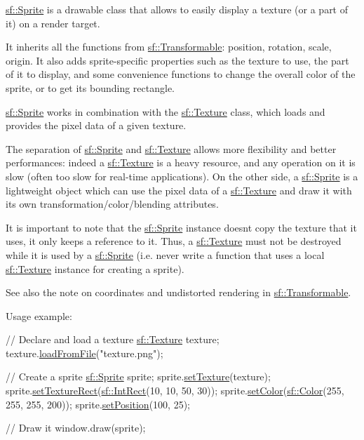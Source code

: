 \hyperlink{classsf_1_1Sprite}{sf\+::\+Sprite} is a drawable class that allows to easily display a texture (or a part of it) on a render target.

It inherits all the functions from \hyperlink{classsf_1_1Transformable}{sf\+::\+Transformable}\+: position, rotation, scale, origin. It also adds sprite-\/specific properties such as the texture to use, the part of it to display, and some convenience functions to change the overall color of the sprite, or to get its bounding rectangle.

\hyperlink{classsf_1_1Sprite}{sf\+::\+Sprite} works in combination with the \hyperlink{classsf_1_1Texture}{sf\+::\+Texture} class, which loads and provides the pixel data of a given texture.

The separation of \hyperlink{classsf_1_1Sprite}{sf\+::\+Sprite} and \hyperlink{classsf_1_1Texture}{sf\+::\+Texture} allows more flexibility and better performances\+: indeed a \hyperlink{classsf_1_1Texture}{sf\+::\+Texture} is a heavy resource, and any operation on it is slow (often too slow for real-\/time applications). On the other side, a \hyperlink{classsf_1_1Sprite}{sf\+::\+Sprite} is a lightweight object which can use the pixel data of a \hyperlink{classsf_1_1Texture}{sf\+::\+Texture} and draw it with its own transformation/color/blending attributes.

It is important to note that the \hyperlink{classsf_1_1Sprite}{sf\+::\+Sprite} instance doesn\textquotesingle{}t copy the texture that it uses, it only keeps a reference to it. Thus, a \hyperlink{classsf_1_1Texture}{sf\+::\+Texture} must not be destroyed while it is used by a \hyperlink{classsf_1_1Sprite}{sf\+::\+Sprite} (i.\+e. never write a function that uses a local \hyperlink{classsf_1_1Texture}{sf\+::\+Texture} instance for creating a sprite).

See also the note on coordinates and undistorted rendering in \hyperlink{classsf_1_1Transformable}{sf\+::\+Transformable}.

Usage example\+: 
\begin{DoxyCode}
\textcolor{comment}{// Declare and load a texture}
\hyperlink{classsf_1_1Texture}{sf::Texture} texture;
texture.\hyperlink{classsf_1_1Texture_a8e1b56eabfe33e2e0e1cb03712c7fcc7}{loadFromFile}(\textcolor{stringliteral}{"texture.png"});

\textcolor{comment}{// Create a sprite}
\hyperlink{classsf_1_1Sprite}{sf::Sprite} sprite;
sprite.\hyperlink{classsf_1_1Sprite_a3729c88d88ac38c19317c18e87242560}{setTexture}(texture);
sprite.\hyperlink{classsf_1_1Sprite_a3fefec419a4e6a90c0fd54c793d82ec2}{setTextureRect}(\hyperlink{classsf_1_1Rect}{sf::IntRect}(10, 10, 50, 30));
sprite.\hyperlink{classsf_1_1Sprite_a14def44da6437bfea20c4df5e71aba4c}{setColor}(\hyperlink{classsf_1_1Color}{sf::Color}(255, 255, 255, 200));
sprite.\hyperlink{classsf_1_1Transformable_a4dbfb1a7c80688b0b4c477d706550208}{setPosition}(100, 25);

\textcolor{comment}{// Draw it}
window.draw(sprite);
\end{DoxyCode}


